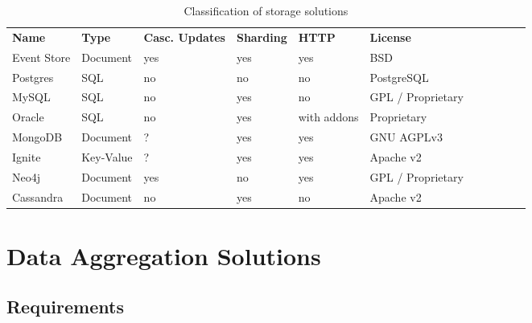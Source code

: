 \begin{table}[]
\centering
\caption{Classification of storage solutions}
\begin{tabular}{lllllllllll}
\textbf{Name} & \textbf{Type} & \textbf{Casc. Updates} & \textbf{Sharding} & \textbf{HTTP} & \textbf{License} \\
Event Store & Document & yes & yes & yes & BSD \\
Postgres & SQL & no & no & no & PostgreSQL \\
MySQL & SQL & no & yes & no & GPL / Proprietary \\
Oracle & SQL & no & yes & with addons & Proprietary \\
MongoDB & Document & ? & yes & yes & GNU AGPLv3 \\
Ignite & Key-Value & ? & yes & yes & Apache v2 \\
Neo4j & Document & yes & no & yes & GPL / Proprietary \\
Cassandra & Document & no & yes & no & Apache v2
\end{tabular}
\label{table:classifications:storage}
\end{table}

\section{Data Aggregation Solutions}
\label{sec:classifications:aggregation}

\subsection{Requirements}


